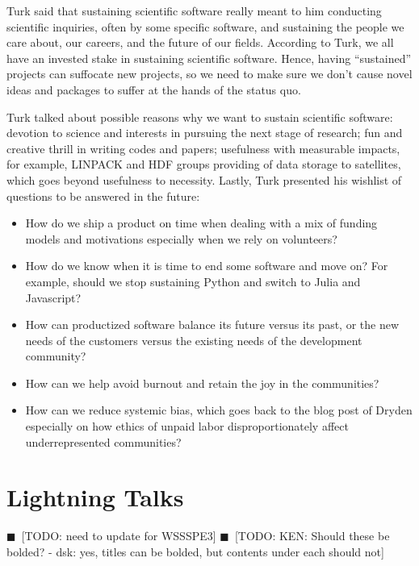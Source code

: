 \documentclass[11pt, oneside]{amsart}
\newcommand{\todo}[1]{{\color{blue}$\blacksquare$~\textsf{[TODO: #1]}}}
\newcommand{\note}[1]{ {\textcolor{blueish}    { ***Note:      #1 }}}
\begin{document}
Turk said that sustaining scientific software really meant to him conducting
scientific inquiries, often by some specific software, and sustaining the people
we care about, our careers, and the future of our fields. According to Turk, we
all have an invested stake in sustaining scientific software. Hence, having
``sustained'' projects can suffocate new projects, so we need to make sure
we don't cause novel ideas and packages to suffer at the hands of the status quo.

Turk talked about possible reasons why we want to sustain scientific
software: devotion to science and interests in pursuing the next stage of
research; fun and creative thrill in writing codes and papers; usefulness with
measurable impacts, for example, LINPACK and HDF groups providing of data
storage to satellites, which goes beyond usefulness to necessity. Lastly, Turk
presented his wishlist of questions to be answered in the future: 
%
\begin{itemize} 

\item How do we ship a product on time when dealing with a mix of funding models
and motivations especially when we rely on volunteers?

\item How do we know when it is time to end some software and move on? For
example, should we stop sustaining Python and switch to Julia and Javascript?
 
\item How can productized software balance its future versus its past, or the new
needs of the customers versus the existing needs of the development community?

\item How can we help avoid burnout and retain the joy in the communities?

\item How can we reduce systemic bias, which goes back to the blog post of
Dryden especially on how ethics of unpaid labor disproportionately affect
underrepresented communities?

\end{itemize}

\section{Lightning Talks} \label{sec:lightning}
\todo{need to update for WSSSPE3}
\todo{KEN: Should these be bolded? - dsk: yes, titles can be bolded, but contents under each should not}
\begin{comment}
\note{
\href{http://wssspe.researchcomputing.org.uk/wssspe3/agenda/}{Slides.}}
\end{comment}
\end{document}
